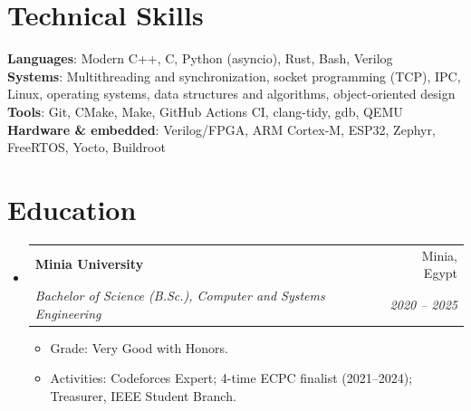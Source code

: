 \documentclass[letterpaper,11pt]{article}
\makeatletter
\newcommand{\resumeItem}[1]{
  \item\small{
    {#1 \vspace{-2pt}}
  }
}
\newcommand{\resumeSubheading}[4]{
  \vspace{-2pt}\item
    \begin{tabular*}{0.97\textwidth}[t]{l@{\extracolsep{\fill}}r}
      \textbf{#1} & #2 \\
      \textit{\small#3} & \textit{\small #4} \\
    \end{tabular*}\vspace{-7pt}
}
\newcommand{\resumeSubHeadingListStart}{\begin{itemize}[leftmargin=0.15in, label={}]}
\newcommand{\resumeSubHeadingListEnd}{\end{itemize}}
\newcommand{\resumeItemListStart}{\begin{itemize}}
\newcommand{\resumeItemListEnd}{\end{itemize}\vspace{-5pt}}
\makeatother
\begin{document}
%
\section{Technical Skills}
 \begin{itemize}[leftmargin=0.15in, label={}]
    \small{\item{
     \textbf{Languages}{: Modern C++, C, Python (asyncio), Rust, Bash, Verilog} \\
     \textbf{Systems}{: Multithreading and synchronization, socket programming (TCP), IPC, Linux, operating systems, data structures and algorithms, object-oriented design} \\
     \textbf{Tools}{: Git, CMake, Make, GitHub Actions CI, clang-tidy, gdb, QEMU} \\
     \textbf{Hardware \& embedded}{: Verilog/FPGA, ARM Cortex-M, ESP32, Zephyr, FreeRTOS, Yocto, Buildroot}
    }}
 \end{itemize}

\section{Education}
  \resumeSubHeadingListStart
    \resumeSubheading
      {Minia University}{Minia, Egypt}
      {Bachelor of Science (B.Sc.), Computer and Systems Engineering}{2020 -- 2025}
      \resumeItemListStart
        \resumeItem{Grade: Very Good with Honors.}
        \resumeItem{Activities: Codeforces Expert; 4-time ECPC finalist (2021--2024); Treasurer, IEEE Student Branch.}
      \resumeItemListEnd
  \resumeSubHeadingListEnd


\end{document}
